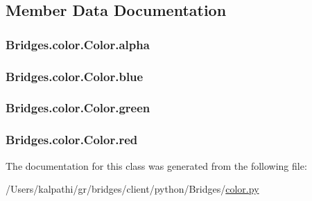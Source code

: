\subsection{Member Data Documentation}
\hypertarget{class_bridges_1_1color_1_1_color_a4074ee82f60039f1964c9c92049d12f2}{}
\subsubsection[{alpha}]{\setlength{\rightskip}{0pt plus 5cm}Bridges.\+color.\+Color.\+alpha}\label{class_bridges_1_1color_1_1_color_a4074ee82f60039f1964c9c92049d12f2}
\hypertarget{class_bridges_1_1color_1_1_color_ab3eb91c32b56dcb17fc9315706439137}{}
\subsubsection[{blue}]{\setlength{\rightskip}{0pt plus 5cm}Bridges.\+color.\+Color.\+blue}\label{class_bridges_1_1color_1_1_color_ab3eb91c32b56dcb17fc9315706439137}
\hypertarget{class_bridges_1_1color_1_1_color_ac7b1d3a34feecde69b5437214ff83895}{}
\subsubsection[{green}]{\setlength{\rightskip}{0pt plus 5cm}Bridges.\+color.\+Color.\+green}\label{class_bridges_1_1color_1_1_color_ac7b1d3a34feecde69b5437214ff83895}
\hypertarget{class_bridges_1_1color_1_1_color_a25663f2be911b45eea32c70a24ef983b}{}
\subsubsection[{red}]{\setlength{\rightskip}{0pt plus 5cm}Bridges.\+color.\+Color.\+red}\label{class_bridges_1_1color_1_1_color_a25663f2be911b45eea32c70a24ef983b}


The documentation for this class was generated from the following file\+:\begin{DoxyCompactItemize}
\item 
/\+Users/kalpathi/gr/bridges/client/python/\+Bridges/\hyperlink{color_8py}{color.\+py}\end{DoxyCompactItemize}
